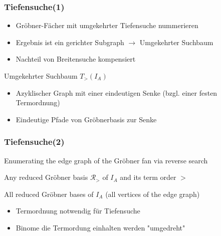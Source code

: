 \documentclass{beamer}
\newcommand{\Input}{\item[\algorithmicinput]}
\newcommand{\algorithmicinput}{\textbf{Input:}}
\newcommand{\Output}{\item[\algorithmicoutput]}
\newcommand{\algorithmicoutput}{\textbf{Output:}}
\begin{document}

\begin{frame}[fragile]
\frametitle{Tiefensuche(1)}

\begin{itemize}
\item Gröbner-Fächer mit umgekehrter Tiefensuche nummerieren
\item Ergebnis ist ein gerichter Subgraph $\longrightarrow$ Umgekehrter Suchbaum 
\item Nachteil von Breitensuche kompensiert

\end{itemize}

\begin{block}{Umgekehrter Suchbaum $T_{>}(I_{A})$}
\begin{itemize}
\item Azyklischer Graph mit einer eindeutigen Senke (bzgl. einer festen Termordnung)
\item Eindeutige Pfade von Gröbnerbasis zur Senke
\end{itemize}

\end{block}
 
\end{frame}



\begin{frame}[fragile]
\frametitle{Tiefensuche(2)}


\begin{algorithm}[H]
\caption{Enumerating the edge graph of the Gröbner fan via reverse search}

\begin{algorithmic}[1]

\Input
Any reduced Gröbner basis $ \mathcal{R}_{>} $ of $I_A$ and its term order $>$
\Output All reduced Gröbner bases of $I_A$ (all vertices of the edge graph)


\end{algorithmic}
\end{algorithm}

\begin{itemize}
\item Termordnung notwendig für Tiefensuche
\item Binome die Termordung einhalten werden "umgedreht"
\end{itemize}

 
\end{frame}
\end{document}
